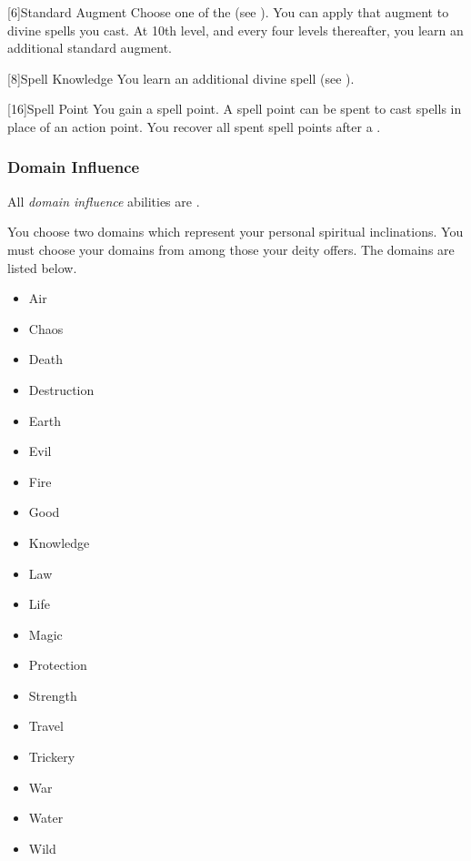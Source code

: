             [6]{Standard Augment}
            Choose one of the  (see ).
            You can apply that augment to divine spells you cast.
            At 10th level, and every four levels thereafter, you learn an additional standard augment.

            [8]{Spell Knowledge}
            You learn an additional divine spell (see ).

            [16]{Spell Point} 
            You gain a spell point.
            A spell point can be spent to cast spells in place of an action point.
            You recover all spent spell points after a .

        \subsubsection{Domain Influence}
            All \textit{domain influence} abilities are .

            You choose two domains which represent your personal spiritual inclinations.
            You must choose your domains from among those your deity offers.
            The domains are listed below.

            \begin{itemize}
                \item{Air}
                \item{Chaos}
                \item{Death}
                \item{Destruction}
                \item{Earth}
                \item{Evil}
                \item{Fire}
                \item{Good}
                \item{Knowledge}
                \item{Law}
                \item{Life}
                \item{Magic}
                \item{Protection}
                \item{Strength}
                \item{Travel}
                \item{Trickery}
                \item{War}
                \item{Water}
                \item{Wild}
            \end{itemize}

